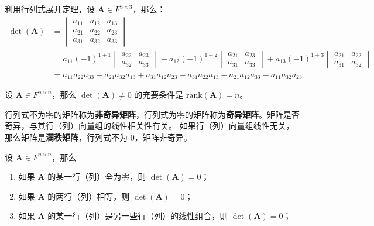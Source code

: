 \begin{example}
    利用行列式展开定理，设 $\mathbf{A}\in F^{3\times 3}$，那么：
    \begin{align*}
        \det(\mathbf{A}) &= \begin{vmatrix}
            a_{11} & a_{12} & a_{13} \\
            a_{21} & a_{22} & a_{23} \\
            a_{31} & a_{32} & a_{33}
        \end{vmatrix}\\
        &= a_{11} (-1)^{1+1}\begin{vmatrix}
                a_{22} & a_{23} \\
                a_{32} & a_{33}
            \end{vmatrix} +
            a_{12} (-1)^{1+2}\begin{vmatrix}
                a_{21} & a_{23} \\
                a_{31} & a_{33}
            \end{vmatrix} +
            a_{13} (-1)^{1+3}\begin{vmatrix}
                a_{21} & a_{22} \\
                a_{31} & a_{32}
            \end{vmatrix}\\
        &= a_{11}a_{22}a_{33}+a_{21}a_{32}a_{13}+a_{31}a_{12}a_{23}-a_{31}a_{22}a_{13}-a_{21}a_{12}a_{33}-a_{11}a_{32}a_{23}
    \end{align*}
\end{example}

\vspace{1em}

\begin{proposition}[行列式不为零的充要条件]
    设 $\mathbf{A} \in F^{n \times n}$，那么 $\det(\mathbf{A}) \neq 0$ 的充要条件是 $\mathrm{rank}(\mathbf{A}) = n$。
    \label{prop:det_nonzero_iff_full_rank}
\end{proposition}
\begin{note}
    行列式不为零的矩阵称为\textbf{非奇异矩阵}，行列式为零的矩阵称为\textbf{奇异矩阵}。矩阵是否奇异，与其行（列）向量组的线性相关性有关。
    如果行（列）向量组线性无关，那么矩阵是\textbf{满秩矩阵}，行列式不为 0，矩阵非奇异。
\end{note}

\begin{corollary}
    设 $\mathbf{A} \in F^{n \times n}$，那么
    \begin{enumerate}
        \item 如果 $\mathbf{A}$ 的某一行（列）全为零，则 $\det(\mathbf{A}) = 0$；
        \item 如果 $\mathbf{A}$ 的两行（列）相等，则 $\det(\mathbf{A}) = 0$；
        \item 如果 $\mathbf{A}$ 的某一行（列）是另一些行（列）的线性组合，则 $\det(\mathbf{A}) = 0$；
    \end{enumerate}
\end{corollary}

